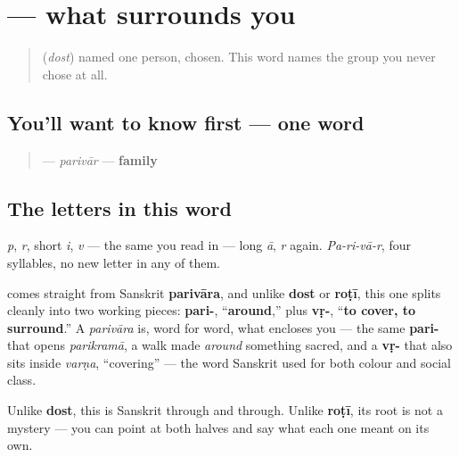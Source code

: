 \section[\texorpdfstring{\pa{ਪਰਿਵਾਰ} (parivār)}{ਪਰਿਵਾਰ (parivār)}]{ — what surrounds you}

\label{lesson:PA-C11-parivar}



\begin{quote}
\textbf{} (\emph{dost}) named one person, chosen. This word names the group you never chose at all.
\end{quote}

\subsection*{You'll want to know first — one word}
\begin{quote}
\textbf{} — \emph{parivār} — \textbf{family}
\end{quote}

\subsection*{The letters in this word}
\textbf{} \emph{p}, \textbf{} \emph{r}, \textbf{} short \emph{i}, \textbf{} \emph{v} — the same \textbf{} you read in \textbf{} — \textbf{} long \emph{ā}, \textbf{} \emph{r} again. \emph{Pa-ri-vā-r}, four syllables, no new letter in any of them.

\begin{cousinweb}
\textbf{} comes straight from Sanskrit \textbf{parivāra}, and unlike \textbf{dost} or \textbf{roṭī}, this one splits cleanly into two working pieces: \textbf{pari-}, \textquotedblleft{}\textbf{around},\textquotedblright{} plus \textbf{vṛ-}, \textquotedblleft{}\textbf{to cover, to surround}.\textquotedblright{} A \emph{parivāra} is, word for word, what encloses you — the same \textbf{pari-} that opens \emph{parikramā}, a walk made \emph{around} something sacred, and a \textbf{vṛ-} that also sits inside \emph{varṇa}, \textquotedblleft{}covering\textquotedblright{} — the word Sanskrit used for both colour and social class.

Unlike \textbf{dost}, this is Sanskrit through and through. Unlike \textbf{roṭī}, its root is not a mystery — you can point at both halves and say what each one meant on its own.
\end{cousinweb}


